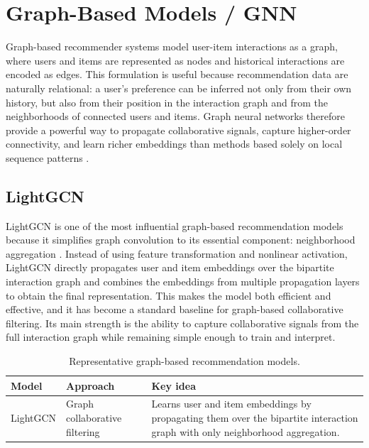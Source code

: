 \documentclass[12pt,a4paper]{report}
\begin{document}
\section{Graph-Based Models / GNN}

Graph-based recommender systems model user-item interactions as a graph, where
users and items are represented as nodes and historical interactions are encoded
as edges. This formulation is useful because recommendation data are naturally
relational: a user's preference can be inferred not only from their own history,
but also from their position in the interaction graph and from the neighborhoods
of connected users and items. Graph neural networks therefore provide a powerful
way to propagate collaborative signals, capture higher-order connectivity, and
learn richer embeddings than methods based solely on local sequence patterns
\citep{wu2020gnnsurvey,he2020lightgcn}.

\subsection{LightGCN}

LightGCN is one of the most influential graph-based recommendation models
because it simplifies graph convolution to its essential component:
neighborhood aggregation \citep{he2020lightgcn}. Instead of using feature
transformation and nonlinear activation, LightGCN directly propagates user and
item embeddings over the bipartite interaction graph and combines the embeddings
from multiple propagation layers to obtain the final representation. This makes
the model both efficient and effective, and it has become a standard baseline
for graph-based collaborative filtering. Its main strength is the ability to
capture collaborative signals from the full interaction graph while remaining
simple enough to train and interpret.

\begin{table}[h]
\centering
\begin{tabular}{p{3cm} p{3cm} p{6.8cm}}
\toprule
\textbf{Model} & \textbf{Approach} & \textbf{Key idea} \\
\midrule
LightGCN & Graph collaborative filtering & Learns user and item embeddings by propagating them over the bipartite interaction graph with only neighborhood aggregation. \\
\bottomrule
\end{tabular}
\caption{Representative graph-based recommendation models.}
\label{tab:graph_models}
\end{table}
\end{document}
